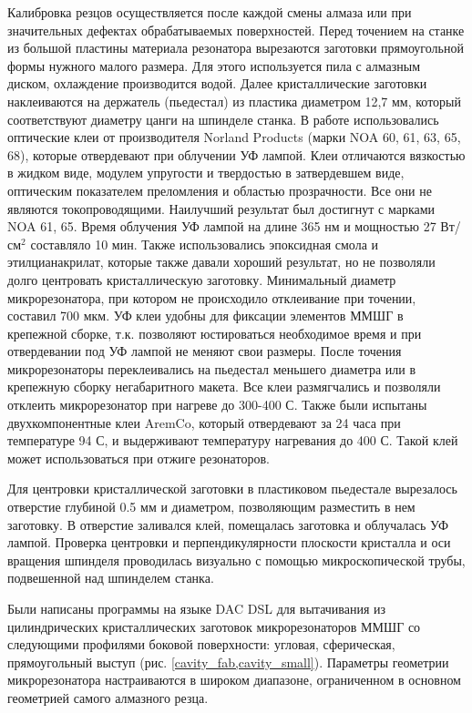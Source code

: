 Калибровка резцов осуществляется после каждой смены алмаза или при значительных дефектах обрабатываемых поверхностей.
Перед точением на станке из большой пластины материала резонатора вырезаются заготовки прямоугольной формы нужного малого размера. Для этого используется пила с алмазным диском, охлаждение производится водой.
Далее кристаллические заготовки наклеиваются на держатель (пьедестал) из пластика диаметром 12,7 мм, который соответствуют диаметру цанги на шпинделе станка. В работе использовались оптические клеи от производителя Norland Products (марки NOA 60, 61, 63, 65, 68), которые отвердевают при облучении УФ лампой. Клеи отличаются вязкостью в жидком виде, модулем упругости и твердостью в затвердевшем виде, оптическим показателем преломления и областью прозрачности. Все они не являются токопроводящими. Наилучший результат был достигнут с марками NOA 61, 65. Время облучения УФ лампой на длине 365 нм и мощностью 27 Вт/см$^2$ составляло 10 мин. Также использовались эпоксидная смола и этилцианакрилат, которые также давали хороший результат, но не позволяли долго центровать кристаллическую заготовку. Минимальный диаметр микрорезонатора, при котором не происходило отклеивание при точении, составил 700 мкм.
УФ клеи удобны для фиксации элементов ММШГ в крепежной сборке, т.к. позволяют юстироваться необходимое время и при отвердевании под УФ лампой не меняют свои размеры. После точения микрорезонаторы переклеивались на пьедестал меньшего диаметра или в крепежную сборку негабаритного макета. Все клеи размягчались и позволяли отклеить микрорезонатор при нагреве до 300-400 С. Также были испытаны двухкомпонентные клеи AremCo, который отвердевают за 24 часа при температуре 94 С, и выдерживают температуру нагревания до 400 С. Такой клей может использоваться при отжиге резонаторов.

Для центровки кристаллической заготовки в пластиковом пьедестале вырезалось отверстие глубиной 0.5 мм и диаметром, позволяющим разместить в нем заготовку. В отверстие заливался клей, помещалась заготовка и облучалась УФ лампой. Проверка центровки и перпендикулярности плоскости кристалла и оси вращения шпинделя проводилась визуально с помощью микроскопической трубы, подвешенной над шпинделем станка.

Были написаны программы на языке DAC DSL для вытачивания из цилиндрических кристаллических заготовок микрорезонаторов ММШГ со следующими профилями боковой поверхности: угловая, сферическая, прямоугольный выступ (рис. \ref{cavity_fab,cavity_small}). Параметры геометрии микрорезонатора настраиваются в широком диапазоне, ограниченном в основном геометрией самого алмазного резца.


